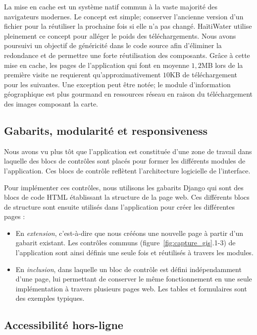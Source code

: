 \documentclass{EPL-master-thesis-covers-FR}
\begin{document}
				La mise en cache est un système natif commun à la vaste majorité des navigateurs modernes. Le concept est simple; conserver l'ancienne version d'un fichier pour la réutiliser la prochaine fois si elle n'a pas changé. HaïtiWater utilise pleinement ce concept pour alléger le poids des téléchargements. Nous avons poursuivi un objectif de généricité dans le code source afin d'éliminer la redondance et de permettre une forte réutilisation des composants. Grâce à cette mise en cache, les pages de l'application qui font en moyenne $1,2$MB lors de la première visite ne requierent qu'approximativement $10$KB de téléchargement pour les suivantes. Une exception peut être notée; le module d'information géographique est plus gourmand en ressources réseau en raison du téléchargement des images composant la carte.

			\subsection*{Gabarits, modularité et responsiveness}
				Nous avons vu plus tôt que l'application est constituée d'une zone de travail dans laquelle des blocs de contrôles sont placés pour former les différents modules de l'application. Ces blocs de contrôle reflètent l'architecture logicielle de l'interface.

				Pour implémenter ces contrôles, nous utilisons les gabarits Django qui sont des blocs de code HTML établissant la structure de la page web. Ces différents blocs de structure sont ensuite utilisés dans l'application pour créer les différentes pages :
				\begin{itemize}
					\item En \emph{extension}, c'est-à-dire que nous crééons une nouvelle page à partir d'un gabarit existant. Les contrôles communs (figure~\ref{fig:capture_gis}.1-3) de l'application sont ainsi définis une seule fois et réutilisés à travers les modules.
					\item En \emph{inclusion}, dans laquelle un bloc de contrôle est défini indépendamment d'une page, lui permettant de conserver le même fonctionnement en une seule implémentation à travers plusieurs pages web. Les tables et formulaires sont des exemples typiques.
				\end{itemize}

			\subsection*{Accessibilité hors-ligne}
				\label{sec:service_worker}
\end{document}

